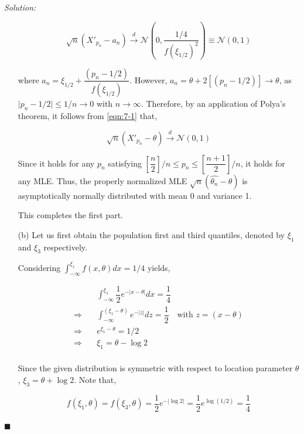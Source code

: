 \documentclass[12pt]{article}
\newcommand{\normal}{\mathcal{N}}
\theoremstyle{definition}
\newenvironment{answer}{\textit{Solution: }\quad }{ \hfill $\blacksquare$}
\numberwithin{equation}{section}
\begin{document}
\begin{answer}
\begin{enumerate}
        \begin{equation}
            \sqrt{n} (X'_{p_n} - a_n) \xrightarrow{d} \normal\left( 0, \dfrac{1/4}{f(\xi_{1/2})^2}\right) \equiv \normal\left( 0, 1\right)
            \label{eqn:7-1}            
        \end{equation}

        where $a_n = \xi_{1/2} + \dfrac{(p_n - 1/2)}{f(\xi_{1/2})}$. However, $a_n = \theta + 2\left[ (p_n - 1/2) \right] \rightarrow \theta$, as $\vert p_n - 1/2 \vert \leq 1/n \rightarrow 0$ with $n\rightarrow \infty$. Therefore, by an application of Polya's theorem, it follows from \cref{eqn:7-1} that, 

        \begin{equation}
            \sqrt{n} (X'_{p_n} - \theta) \xrightarrow{d} \normal\left( 0, 1\right)
            \label{eqn:7-2}
        \end{equation}

        Since it holds for any $p_n$ satisfying $\left[ \dfrac{n}{2} \right]/n \leq p_n \leq \left[ \dfrac{n+1}{2} \right]/n$, it holds for any MLE. Thus, the properly normalized MLE $\sqrt{n}(\widehat{\theta_n} - \theta)$ is asymptotically normally distributed with mean 0 and variance 1.

        This completes the first part.

        \item[(b)] Let us first obtain the population first and third quantiles, denoted by $\xi_1$ and $\xi_3$ respectively.
        
        Considering $\int_{-\infty}^{\xi_1} f(x, \theta) dx = 1/4$ yields, 

        \begin{align*}
            & \int_{-\infty}^{\xi_1} \dfrac{1}{2} e^{-\vert x - \theta \vert}dx = \dfrac{1}{4}\\
            \Rightarrow \quad & \int_{-\infty}^{(\xi_1 - \theta)} e^{-\vert z \vert} dz = \dfrac{1}{2} \quad \text{with } z = (x - \theta)\\
            \Rightarrow \quad & e^{\xi_1 - \theta} = 1/2\\
            \Rightarrow \quad & \xi_1 = \theta - \log 2\\
        \end{align*}

        Since the given distribution is symmetric with respect to location parameter $\theta$, $\xi_3 = \theta + \log 2$. Note that,

        $$
        f(\xi_1, \theta) = f(\xi_3, \theta) = \dfrac{1}{2} e^{-\vert \log 2\vert} = \dfrac{1}{2} e^{\log (1/2)} = \dfrac{1}{4}
        $$
        

\end{enumerate}
\end{answer}
\end{document}
